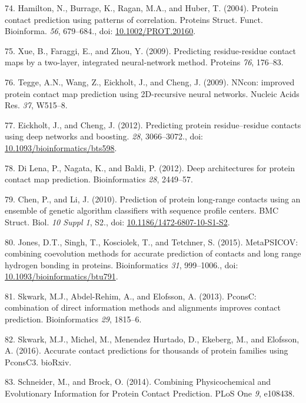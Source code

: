 \documentclass[11pt,a4paper,twoside]{book}
\theoremstyle{definition}
\theoremstyle{definition}
\theoremstyle{remark}
\begin{document}
\hypertarget{ref-Hamilton2004a}{}
74. Hamilton, N., Burrage, K., Ragan, M.A., and Huber, T. (2004).
Protein contact prediction using patterns of correlation. Proteins
Struct. Funct. Bioinforma. \emph{56}, 679--684., doi:
\href{https://doi.org/10.1002/PROT.20160}{10.1002/PROT.20160}.

\hypertarget{ref-Xue2009a}{}
75. Xue, B., Faraggi, E., and Zhou, Y. (2009). Predicting
residue-residue contact maps by a two-layer, integrated neural-network
method. Proteins \emph{76}, 176--83.

\hypertarget{ref-Tegge2009a}{}
76. Tegge, A.N., Wang, Z., Eickholt, J., and Cheng, J. (2009). NNcon:
improved protein contact map prediction using 2D-recursive neural
networks. Nucleic Acids Res. \emph{37}, W515--8.

\hypertarget{ref-Eickholt2012}{}
77. Eickholt, J., and Cheng, J. (2012). Predicting protein
residue--residue contacts using deep networks and boosting. \emph{28},
3066--3072., doi:
\href{https://doi.org/10.1093/bioinformatics/bts598}{10.1093/bioinformatics/bts598}.

\hypertarget{ref-DiLena2012a}{}
78. Di Lena, P., Nagata, K., and Baldi, P. (2012). Deep architectures
for protein contact map prediction. Bioinformatics \emph{28}, 2449--57.

\hypertarget{ref-Chen2010}{}
79. Chen, P., and Li, J. (2010). Prediction of protein long-range
contacts using an ensemble of genetic algorithm classifiers with
sequence profile centers. BMC Struct. Biol. \emph{10 Suppl 1}, S2., doi:
\href{https://doi.org/10.1186/1472-6807-10-S1-S2}{10.1186/1472-6807-10-S1-S2}.

\hypertarget{ref-Jones2015}{}
80. Jones, D.T., Singh, T., Kosciolek, T., and Tetchner, S. (2015).
MetaPSICOV: combining coevolution methods for accurate prediction of
contacts and long range hydrogen bonding in proteins. Bioinformatics
\emph{31}, 999--1006., doi:
\href{https://doi.org/10.1093/bioinformatics/btu791}{10.1093/bioinformatics/btu791}.

\hypertarget{ref-Skwark2013}{}
81. Skwark, M.J., Abdel-Rehim, A., and Elofsson, A. (2013). PconsC:
combination of direct information methods and alignments improves
contact prediction. Bioinformatics \emph{29}, 1815--6.

\hypertarget{ref-Skwark2016}{}
82. Skwark, M.J., Michel, M., Menendez Hurtado, D., Ekeberg, M., and
Elofsson, A. (2016). Accurate contact predictions for thousands of
protein families using PconsC3. bioRxiv.

\hypertarget{ref-Schneider2014}{}
83. Schneider, M., and Brock, O. (2014). Combining Physicochemical and
Evolutionary Information for Protein Contact Prediction. PLoS One
\emph{9}, e108438.
\end{document}
